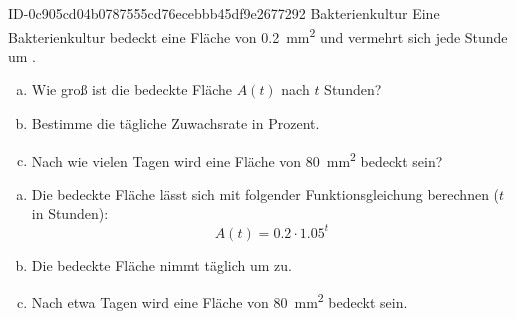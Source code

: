 \begin{exercise}
      {ID-0c905cd04b0787555cd76ecebbb45df9e2677292}
      {Bakterienkultur}
  \ifproblem\problem
    Eine Bakterienkultur bedeckt eine Fläche von \SI{0.2}{\square\milli\metre}
    und vermehrt sich jede Stunde um .
    \begin{enumerate}[a)]
      \item Wie groß ist die bedeckte Fläche $A(t)$ nach $t$ Stunden?
      \item Bestimme die tägliche Zuwachsrate in Prozent.
      \item Nach wie vielen Tagen wird eine Fläche von
            \SI{80}{\square\milli\metre} bedeckt sein?
    \end{enumerate}
  \fi
  \ifoutcome\outcome
    \begin{enumerate}[a)]
      \item Die bedeckte Fläche lässt sich mit folgender
            Funktionsgleichung berechnen ($t$ in Stunden):
            \begin{equation*}
              A(t)=\num{0.2}\cdot\num{1.05}^{t}
            \end{equation*}
      \item Die bedeckte Fläche nimmt täglich um  zu.
      \item Nach etwa  Tagen wird eine Fläche von
            \SI{80}{\square\milli\metre} bedeckt sein.
    \end{enumerate}
  \fi
\end{exercise}
